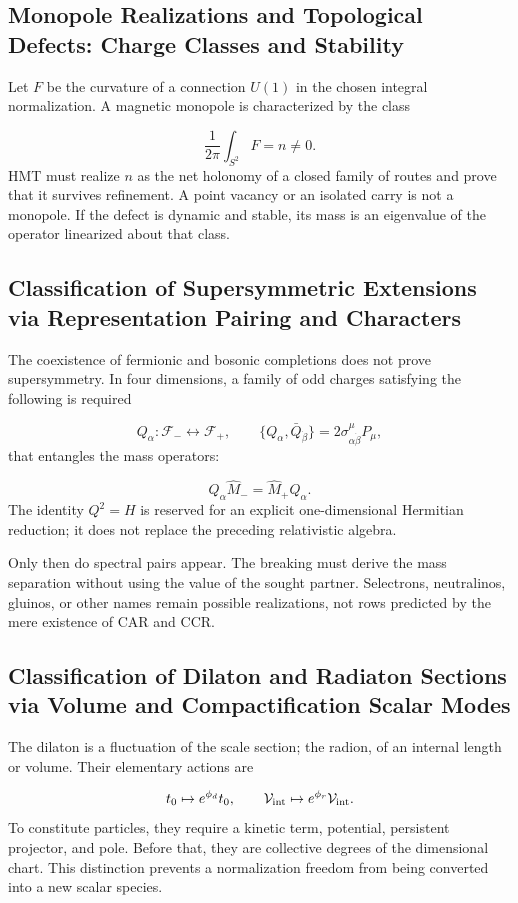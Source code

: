 \subsection{Monopole Realizations and Topological Defects: Charge Classes and Stability}
Let \(F\) be the curvature of a connection \(U(1)\) in the chosen integral normalization. A magnetic monopole is characterized by the class

\[
\frac1{2\pi}\int_{S^2}F=n\ne0.
\]
HMT must realize \(n\) as the net holonomy of a closed family of routes and prove that it survives refinement. A point vacancy or an isolated carry is not a monopole. If the defect is dynamic and stable, its mass is an eigenvalue of the operator linearized about that class.

\subsection{Classification of Supersymmetric Extensions via Representation Pairing and Characters}
The coexistence of fermionic and bosonic completions does not prove supersymmetry. In four dimensions, a family of odd charges satisfying the following is required

\[
Q_\alpha:\mathcal F_-\longleftrightarrow\mathcal F_+,
\qquad
\{Q_\alpha,\bar Q_{\dot\beta}\}
=2\sigma^\mu_{\alpha\dot\beta}P_\mu,
\]
that entangles the mass operators:

\[
Q_\alpha\widehat M_-=\widehat M_+Q_\alpha.
\]
The identity \(Q^2=H\) is reserved for an explicit one-dimensional Hermitian reduction; it does not replace the preceding relativistic algebra.

Only then do spectral pairs appear. The breaking must derive the mass separation without using the value of the sought partner. Selectrons, neutralinos, gluinos, or other names remain possible realizations, not rows predicted by the mere existence of CAR and CCR.

\subsection{Classification of Dilaton and Radiaton Sections via Volume and Compactification Scalar Modes}
The dilaton is a fluctuation of the scale section; the radion, of an internal length or volume. Their elementary actions are

\[
t_0\mapsto e^{\phi_d}t_0,
\qquad
\mathcal V_{\rm int}\mapsto e^{\phi_r}\mathcal V_{\rm int}.
\]
To constitute particles, they require a kinetic term, potential, persistent projector, and pole. Before that, they are collective degrees of the dimensional chart. This distinction prevents a normalization freedom from being converted into a new scalar species.

